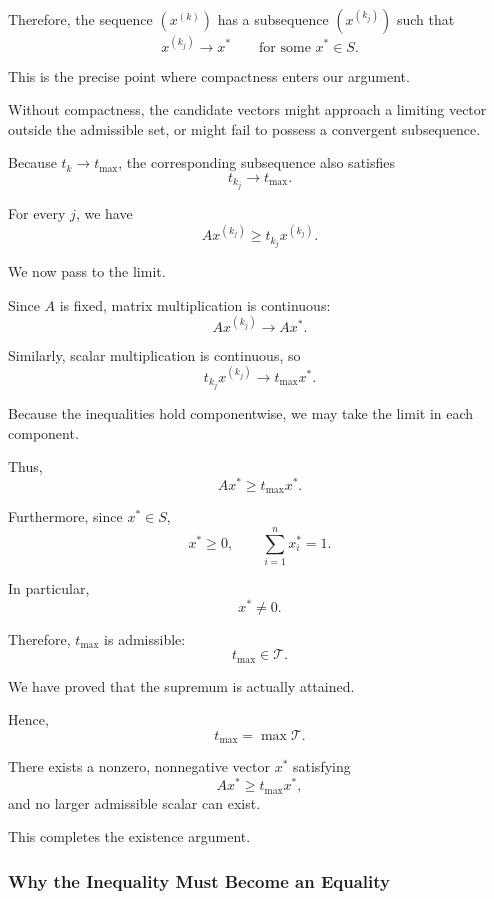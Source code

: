 \documentclass[11pt,a4paper]{article}
\theoremstyle{definition}
\theoremstyle{remark}
\begin{document}
Therefore, the sequence
$(x^{(k)})$ has a subsequence
$(x^{(k_j)})$ such that
\begin{equation}
x^{(k_j)}\longrightarrow x^*
\qquad\text{for some }x^*\in S.
\end{equation}

This is the precise point
where compactness enters
our argument.

Without compactness,
the candidate vectors might
approach a limiting vector
outside the admissible set,
or might fail to possess
a convergent subsequence.

Because $t_k\to t_{\max}$,
the corresponding subsequence
also satisfies
\[
t_{k_j}\longrightarrow t_{\max}.
\]

For every $j$, we have
\[
Ax^{(k_j)}
\geq
t_{k_j}x^{(k_j)}.
\]

We now pass to the limit.

Since $A$ is fixed,
matrix multiplication is continuous:
\[
Ax^{(k_j)}
\longrightarrow Ax^*.
\]

Similarly, scalar multiplication
is continuous, so
\[
t_{k_j}x^{(k_j)}
\longrightarrow t_{\max}x^*.
\]

Because the inequalities
hold componentwise, we may
take the limit in each component.

Thus,
\begin{equation}
\boxed{
Ax^*\geq t_{\max}x^*.
}
\label{eq:perron_maximum_attained}
\end{equation}

Furthermore, since $x^*\in S$,
\[
x^*\geq0,
\qquad
\sum_{i=1}^{n}x_i^*=1.
\]

In particular,
\[
x^*\neq0.
\]

Therefore, $t_{\max}$
is admissible:
\[
t_{\max}\in\mathcal{T}.
\]

We have proved that the
supremum is actually attained.

Hence,
\begin{equation}
\boxed{
t_{\max}
=
\max\mathcal{T}.
}
\end{equation}

There exists a nonzero,
nonnegative vector $x^*$
satisfying
\[
Ax^*\geq t_{\max}x^*,
\]
and no larger admissible
scalar can exist.

This completes the existence
argument.
\subsubsection{Why the Inequality Must Become
an Equality}
\end{document}
